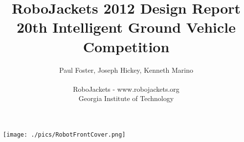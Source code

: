 \documentclass[letterpaper,12pt]{article}
\title{RoboJackets 2012 Design Report\\\large{20th Intelligent Ground Vehicle Competition}}
\author{
Paul Foster, Joseph Hickey, Kenneth Marino
\\
\\
RoboJackets - www.robojackets.org
\\
Georgia Institute of Technology
}
\date{}
\begin{document}
\maketitle
\thispagestyle{empty}
\begin{center}
\texttt{[image: ./pics/RobotFrontCover.png]}
\end{center}

%

\newpage
\setcounter{tocdepth}{2}
\tableofcontents

\newpage
\listoffigures
\listoftables

\newpage


%









\newpage


%
\end{document}
